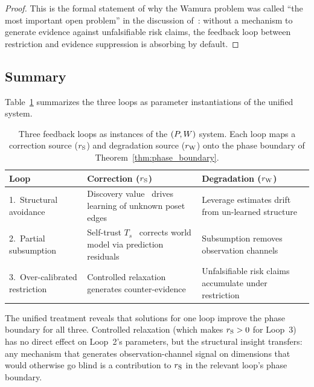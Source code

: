 \begin{proof}
This is the formal statement of why the Wamura problem was called
``the most important open problem'' in the discussion of~\citet{lasser2026horizon}: without a
mechanism to generate evidence against unfalsifiable risk claims, the
feedback loop between restriction and evidence suppression is
absorbing by default.
\end{proof}

\subsection{Summary}

Table~\ref{tab:loops} summarizes the three loops as parameter
instantiations of the unified system.

\begin{table}[h]
\centering
\small
\begin{tabular}{@{}lp{4.5cm}p{4.5cm}@{}}
\toprule
\textbf{Loop} & \textbf{Correction ($r_{\mathrm{S}}$)} & \textbf{Degradation ($r_{\mathrm{W}}$)} \\
\midrule
1.\ Structural avoidance &
  Discovery value~\citep{lasser2026horizon} drives learning of unknown poset edges &
  Leverage estimates drift from un-learned structure \\[0.5em]
2.\ Partial subsumption &
  Self-trust $T_s$~\citep{lasser2026gfm} corrects world model via prediction residuals &
  Subsumption removes observation channels \\[0.5em]
3.\ Over-calibrated restriction &
  Controlled relaxation generates counter-evidence &
  Unfalsifiable risk claims accumulate under restriction \\
\bottomrule
\end{tabular}
\caption{Three feedback loops as instances of the $(P, W)$ system.
  Each loop maps a correction source ($r_{\mathrm{S}}$) and degradation source
  ($r_{\mathrm{W}}$) onto the phase boundary of Theorem~\ref{thm:phase_boundary}.}
\label{tab:loops}
\end{table}

The unified treatment reveals that solutions for one loop improve the
phase boundary for all three.  Controlled relaxation (which makes
$r_{\mathrm{S}} > 0$ for Loop~3) has no direct effect on Loop~2's parameters, but
the structural insight transfers: any mechanism that generates
observation-channel signal on dimensions that would otherwise go blind
is a contribution to $r_{\mathrm{S}}$ in the relevant loop's phase boundary.
